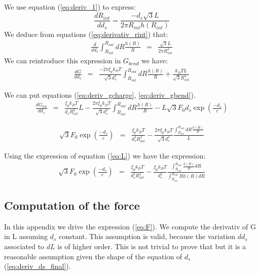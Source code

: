 \documentclass{article}
\begin{document}
 We use equation (\ref{eq:deriv_1}) to express:
 \begin{equation}
     \frac{d R_{int}}{d d_s} = \frac{-d_s \sqrt{3} L}{2 \pi R_{int} h \left( R_{int} \right)}
     \label{eq:derivativ_rint}
 \end{equation}
We deduce from equations (\ref{eq:derivativ_rint}) that:
\begin{eqnarray}
    \frac{d}{d d_s} \int_{R_{int}}^{R_{out}} dR \frac{h(R)}{R} &=&  \frac{\sqrt{3}L}{2\pi R_{int}^2}
\end{eqnarray}
We can reintroduce this expression in $ G_{bend} $ we have:
\begin{eqnarray}
    \frac{d G}{d d_s} &=& \frac{-2\pi \xi_p k_B T}{\sqrt{3} d_s^3} \int_{R_{int}}^{R_{out}} dR \frac{h(R)}{R} + \frac{k_B T L}{\sqrt{3} R_{int}^2}
    \label{eq:deriv_gbend}
\end{eqnarray}

We can put equations (\ref{eq:deriv_gcharge}, \ref{eq:deriv_gbend}). 
\begin{eqnarray*}
    \frac{d G_{tot}}{d d_s} &=& \frac{\xi_p k_B T}{d_s R_{int}^2} L - \frac{2 \pi \xi_p k_B T}{\sqrt{3} d_s^3} \int_{R_{int}}^{R_{out}} dR \frac{h(R)}{R} - L \sqrt{3} F_0 d_s \exp{ \left( \frac{-d_s}{c} \right)}
\end{eqnarray*}

\begin{eqnarray}
    \sqrt{3}F_0 \exp{ \left( \frac{-d_s}{c} \right)} &=& \frac{\xi_p k_B T}{d_s^2 R_{int}^2 } - \frac{2 \pi \xi_p k_B T}{\sqrt{3} d_s^4} \frac{\int_{R_{int}}^{R_{out}} dR \frac{h(R)}{R}}{L} 
    \label{eq:deriv_ds}
\end{eqnarray}

Using the expression of equation (\ref{eq:L}) we have the expression:
\begin{eqnarray}
    \sqrt{3} F_0 \exp{ \left( \frac{-d_s}{c} \right) } &=& \frac{\xi_p k_B T}{d_s^2 R_{int}^2} - \frac{\xi_p k_B T}{d_s^2} \frac{\int_{R_{int}}^{R_{out}} \frac{h(R)}{R} dR}{\int_{R_{int}}^{R_{out}} R h(R) dR} 
\end{eqnarray}

\subsection*{Computation of the force \label{sec:appenForce}}

In this appendix we drive the expression (\ref{eq:F}). We compute the derivativ of G in L assuming $d_s$ constant. This assumption is valid, because the variation $d d_s$ associated to $dL$ is of higher order. This is not trivial to prove that but it is a reasonable assumption given the shape of the equation of $d_s$ (\ref{eq:deriv_ds_final}).
\end{document}
